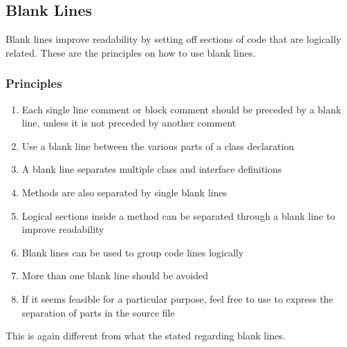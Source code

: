 \subsection{Blank Lines}\label{sec:BlankLines}
Blank lines improve readability by setting off sections of code that are logically related. These are the principles on how to use blank lines.

\subsubsection{Principles}
\begin{enumerate}[label=P\arabic*.]
	\item{Each single line comment or block comment should be preceded by a blank line, unless it is not preceded by another comment}
	
	\item{Use a blank line between the various parts of a class declaration}
	
	\item{A blank line separates multiple class and interface definitions}
	
	\item{Methods are also separated by single blank lines}
	
	\item{Logical sections inside a method can be separated through a blank line to improve readability}
	
	\item{Blank lines can be used to group code lines logically}
	
	\item{More than one blank line should be avoided} 
	
	\item{If it seems feasible for a particular purpose, feel free to use  to express the separation of parts in the source file}
\end{enumerate}

This is again different from what the \autocite{SUN_CODE_CONVENTIONS:BlankLines} stated regarding blank lines.

